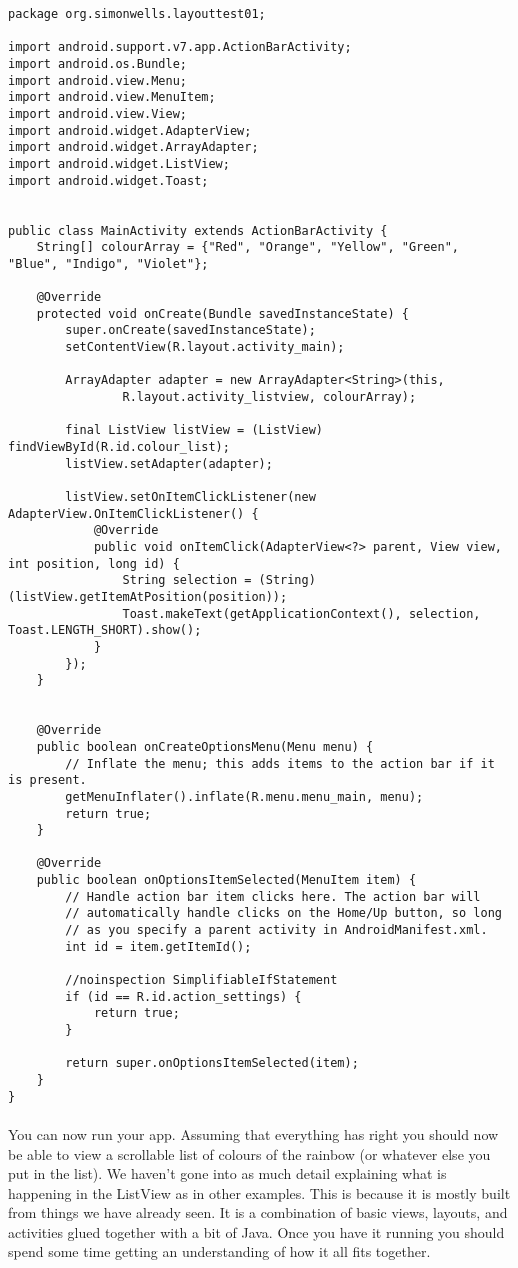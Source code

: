 \begin{lstlisting}
package org.simonwells.layouttest01;

import android.support.v7.app.ActionBarActivity;
import android.os.Bundle;
import android.view.Menu;
import android.view.MenuItem;
import android.view.View;
import android.widget.AdapterView;
import android.widget.ArrayAdapter;
import android.widget.ListView;
import android.widget.Toast;


public class MainActivity extends ActionBarActivity {
    String[] colourArray = {"Red", "Orange", "Yellow", "Green", "Blue", "Indigo", "Violet"};

    @Override
    protected void onCreate(Bundle savedInstanceState) {
        super.onCreate(savedInstanceState);
        setContentView(R.layout.activity_main);

        ArrayAdapter adapter = new ArrayAdapter<String>(this,
                R.layout.activity_listview, colourArray);

        final ListView listView = (ListView) findViewById(R.id.colour_list);
        listView.setAdapter(adapter);

        listView.setOnItemClickListener(new AdapterView.OnItemClickListener() {
            @Override
            public void onItemClick(AdapterView<?> parent, View view, int position, long id) {
                String selection = (String) (listView.getItemAtPosition(position));
                Toast.makeText(getApplicationContext(), selection, Toast.LENGTH_SHORT).show();
            }
        });
    }


    @Override
    public boolean onCreateOptionsMenu(Menu menu) {
        // Inflate the menu; this adds items to the action bar if it is present.
        getMenuInflater().inflate(R.menu.menu_main, menu);
        return true;
    }

    @Override
    public boolean onOptionsItemSelected(MenuItem item) {
        // Handle action bar item clicks here. The action bar will
        // automatically handle clicks on the Home/Up button, so long
        // as you specify a parent activity in AndroidManifest.xml.
        int id = item.getItemId();

        //noinspection SimplifiableIfStatement
        if (id == R.id.action_settings) {
            return true;
        }

        return super.onOptionsItemSelected(item);
    }
}
\end{lstlisting}

\paragraph{} You can now run your app. Assuming that everything has right you should now be able to view a scrollable list of colours of the rainbow (or whatever else you put in the list). We haven't gone into as much detail explaining what is happening in the ListView as in other examples. This is because it is mostly built from things we have already seen. It is a combination of basic views, layouts, and activities glued together with a bit of Java. Once you have it running you should spend some time getting an understanding of how it all fits together.

